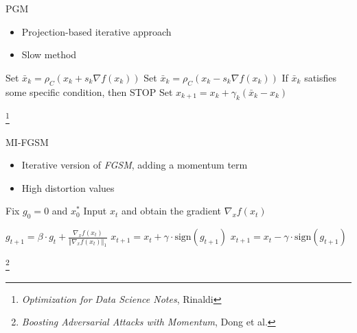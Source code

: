 \documentclass{beamer}
\theoremstyle{plain}
\theoremstyle{definition}
\newcommand\blfootnote[1]{%
  \begingroup
  \renewcommand\thefootnote{}\footnote{#1}%
  \addtocounter{footnote}{-1}%
  \endgroup
}
\begin{document}
\begin{frame}{PGM}

\begin{itemize}
    \item Projection-based iterative approach 
    \item Slow method 
\end{itemize}
    \begin{algorithm}[H]
\caption{PGM}\label{PGD}
\begin{algorithmic}[1]
  \State Set $ \bar{x}_k = \rho_C(x_k + s_k \nabla f(x_k))$ 
  \State Set $ \bar{x}_k = \rho_C(x_k - s_k \nabla f(x_k))$ 
  \State If $\bar{x}_k$ satisfies some specific condition, then STOP
  \State Set $x_{k+1} = x_k + \gamma_k (\bar{x}_k - x_k)$ \Comment{with $\gamma_k \in (0, 1]$}
    
\EndFor
\end{algorithmic}
\end{algorithm}

\blfootnote{\textit{Optimization for Data Science Notes}, Rinaldi}
\end{frame}

\begin{frame}{MI-FGSM}
\begin{itemize}
    \item Iterative version of \textit{FGSM}, adding a momentum term 
    \item High distortion values
\end{itemize}

    \begin{algorithm}[H]
\caption{MI-FGSM}\label{MI_FGSM}
\begin{algorithmic}[1]

\State Fix $g_0 = 0$ and $x_{0}^\ast$ %
    \State Input $x_t$ and obtain the gradient $\nabla_x f(x_t)$

    \State $
        g_{t+1} = \beta \cdot g_t + \frac{\nabla_x f(x_t)}{\Vert \nabla_x f(x_t) \Vert_1}$
    \State $
        x_{t+1} = x_t + \gamma \cdot \text{sign} (g_{t+1}) $ 
    \State $x_{t+1} = x_t - \gamma \cdot \text{sign} (g_{t+1}) $ 
    
\EndFor
\end{algorithmic}
\end{algorithm}

\blfootnote{\textit{Boosting Adversarial Attacks with Momentum}, Dong et al.}
\end{frame}
\end{document}
